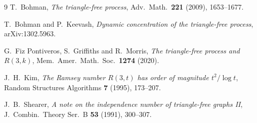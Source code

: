 \documentclass[11pt]{article}
\theoremstyle{definition}
\begin{document}
\begin{thebibliography}{9}
T.~Bohman,
\emph{The triangle-free process},
Adv.\ Math.\ \textbf{221} (2009), 1653--1677.

T.~Bohman and P.~Keevash,
\emph{Dynamic concentration of the triangle-free process},
arXiv:1302.5963.

G.~Fiz Pontiveros, S.~Griffiths and R.~Morris,
\emph{The triangle-free process and $R(3,k)$},
Mem.\ Amer.\ Math.\ Soc.\ \textbf{1274} (2020).

J.~H.~Kim,
\emph{The Ramsey number $R(3,t)$ has order of magnitude $t^{2}/\log t$},
Random Structures Algorithms \textbf{7} (1995), 173--207.

J.~B.~Shearer,
\emph{A note on the independence number of triangle-free graphs II},
J.\ Combin.\ Theory Ser.\ B \textbf{53} (1991), 300--307.
\end{thebibliography}
\end{document}
